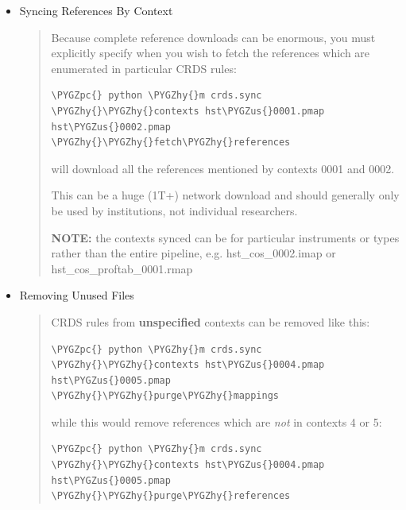 \documentclass[letterpaper,10pt,english]{sphinxmanual}
\def\PYGZus{\char`\_}
\def\PYGZpc{\char`\%}
\def\PYGZhy{\char`\-}
\begin{document}
\begin{itemize}
\begin{quote}
Synced contexts can be specified as --all contexts:

\begin{Verbatim}[commandchars=\\\{\}]
\PYGZpc{} python \PYGZhy{}m crds.sync \PYGZhy{}\PYGZhy{}all
\end{Verbatim}

this will recursively download all CRDS mappings for all time.
\end{quote}

\item {} 
Syncing References By Context
\begin{quote}

Because complete reference downloads can be enormous,  you must explicitly specify when
you wish to fetch the references which are enumerated in particular CRDS rules:

\begin{Verbatim}[commandchars=\\\{\}]
\PYGZpc{} python \PYGZhy{}m crds.sync  \PYGZhy{}\PYGZhy{}contexts hst\PYGZus{}0001.pmap hst\PYGZus{}0002.pmap  \PYGZhy{}\PYGZhy{}fetch\PYGZhy{}references
\end{Verbatim}

will download all the references mentioned by contexts 0001 and 0002.

This can be a huge (1T+) network download and should generally only be
used by institutions,  not individual researchers.

\textbf{NOTE:} the contexts synced can be for particular instruments or types rather than
the entire pipeline,  e.g. hst\_cos\_0002.imap or hst\_cos\_proftab\_0001.rmap
\end{quote}

\item {} 
Removing Unused Files
\begin{quote}

CRDS rules from \textbf{unspecified} contexts can be removed like this:

\begin{Verbatim}[commandchars=\\\{\}]
\PYGZpc{} python \PYGZhy{}m crds.sync  \PYGZhy{}\PYGZhy{}contexts hst\PYGZus{}0004.pmap hst\PYGZus{}0005.pmap \PYGZhy{}\PYGZhy{}purge\PYGZhy{}mappings
\end{Verbatim}

while this would remove references which are \emph{not} in contexts 4 or 5:

\begin{Verbatim}[commandchars=\\\{\}]
\PYGZpc{} python \PYGZhy{}m crds.sync  \PYGZhy{}\PYGZhy{}contexts hst\PYGZus{}0004.pmap hst\PYGZus{}0005.pmap \PYGZhy{}\PYGZhy{}purge\PYGZhy{}references
\end{Verbatim}


\end{quote}
\end{itemize}
\end{document}
